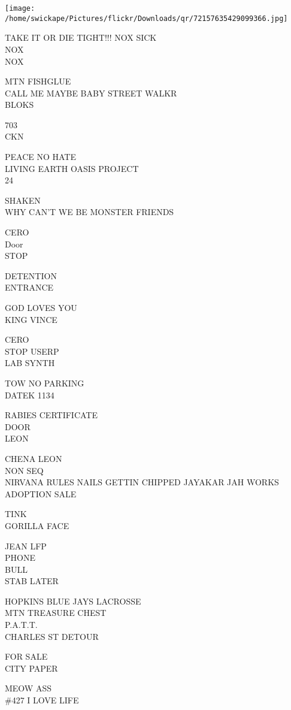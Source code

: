\documentclass[10pt,letterpaper]{article}
\begin{document}
\texttt{[image: /home/swickape/Pictures/flickr/Downloads/qr/72157635429099366.jpg]}
\pagebreak

TAKE IT OR DIE TIGHT!!! NOX SICK\\
NOX\\
NOX

MTN FISHGLUE\\
CALL ME MAYBE BABY STREET WALKR\\
BLOKS

703\\
CKN

PEACE NO HATE\\
LIVING EARTH OASIS PROJECT\\
24

SHAKEN\\
WHY CAN'T WE BE MONSTER FRIENDS

CERO\\
Door\\
STOP

DETENTION\\
ENTRANCE

GOD LOVES YOU\\
KING VINCE

CERO\\
STOP USERP\\
LAB SYNTH

TOW NO PARKING\\
DATEK 1134

RABIES CERTIFICATE\\
DOOR\\
LEON

CHENA LEON\\
NON SEQ\\
NIRVANA RULES NAILS GETTIN CHIPPED JAYAKAR JAH WORKS\\
ADOPTION SALE

TINK\\
GORILLA FACE

JEAN LFP\\
PHONE\\
BULL\\
STAB LATER

HOPKINS BLUE JAYS LACROSSE\\
MTN TREASURE CHEST\\
P.A.T.T.\\
CHARLES ST DETOUR

FOR SALE\\
CITY PAPER

MEOW ASS\\
\#427 I LOVE LIFE
\end{document}

